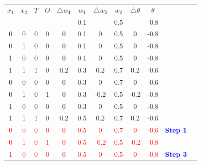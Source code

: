 \documentclass{book}
\begin{document}
\begin{center}
    \begin{tabular}{|c|c|c|c|c|c|c|c|c|c|c|c }
        \cline{1-10}
        \rowcolor{lightblue}
        \textbf{\(x_1\)} & \textbf{\(x_2\)} & \textbf{\(T\)} & \textbf{\(O\)} & \textbf{\(\triangle w_1\)} & \textbf{\(w_1\)} & \textbf{\(\triangle w_2\)} & \textbf{\(w_2\)} & \textbf{\(\triangle \theta\)} & \textbf{\(\theta\)} & \cellcolor{white}{}\\
        \cline{1-10}
        - & - & - & - & - & 0.1 & - & 0.5 & - & -0.8 & \\
        \cline{1-10}
        0 & 0 & 0 & 0 & 0 & 0.1 & 0 & 0.5 & 0 & -0.8 & \\
        \cline{1-10}
        0 & 1 & 0 & 0 & 0 & 0.1 & 0 & 0.5 & 0 & -0.8 & \\
        \cline{1-10}
        1 & 0 & 0 & 0 & 0 & 0.1 & 0 & 0.5 & 0 & -0.8 & \\
        \cline{1-10}
        \rowcolor{lightyellow}
        1 & 1 & 1 & 0 & 0.2 & 0.3 & 0.2 & 0.7 & 0.2 & -0.6 & \cellcolor{white}{} \\
        \cline{1-10}
        0 & 0 & 0 & 0 & 0 & 0.3 & 0 & 0.7 & 0 & -0.6 & \\
        \cline{1-10}
        \rowcolor{lightyellow}
        0 & 1 & 0 & 1 & 0 & 0.3 & -0.2 & 0.5 & -0.2 & -0.8 & \cellcolor{white}{} \\
        \cline{1-10}
        1 & 0 & 0 & 0 & 0 & 0.3 & 0 & 0.5 & 0 & -0.8 & \\
        \cline{1-10}
        \rowcolor{lightyellow}
        1 & 1 & 1 & 0 & 0.2 & 0.5 & 0.2 & 0.7 & 0.2 & -0.6 & \cellcolor{white}{}\\
        \cline{1-10}
        \textcolor{red}{0} & \textcolor{red}{0} & \textcolor{red}{0} & \textcolor{red}{0} & \textcolor{red}{0} & \textcolor{red}{0.5} & \textcolor{red}{0} & \textcolor{red}{0.7} & \textcolor{red}{0} & \textcolor{red}{-0.6} & \textcolor{blue}{\textbf{Step 1}}\\
        \cline{1-10}
        \rowcolor{lightyellow}
        \textcolor{red}{0} & \textcolor{red}{1} & \textcolor{red}{0} & \textcolor{red}{1} & \textcolor{red}{0} & \textcolor{red}{0.5} & \textcolor{red}{-0.2} & \textcolor{red}{0.5} & \textcolor{red}{-0.2} & \textcolor{red}{-0.8} & \cellcolor{white}{\textcolor{blue}{\textbf{Step 2}}} \\
        \cline{1-10}
        \textcolor{red}{1} & \textcolor{red}{0} & \textcolor{red}{0} & \textcolor{red}{0} & \textcolor{red}{0} & \textcolor{red}{0.5} & \textcolor{red}{0} & \textcolor{red}{0.5} & \textcolor{red}{0} & \textcolor{red}{-0.8} & \textcolor{blue}{\textbf{Step 3}} \\

\end{tabular}
\end{center}
\end{document}
